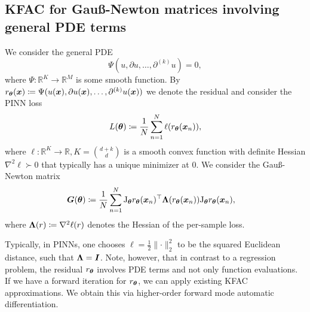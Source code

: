 \subsection{KFAC for Gauß-Newton matrices involving general PDE terms} \label{sec:KFAC-general}
We consider the general %
PDE
\begin{equation}
    \Psi(u, \partial u, \dots, \partial^{(k)} u) = 0,
\end{equation}
where $\Psi\colon \mathbb R^{K}\to\mathbb R^M$ is some smooth function.
By $r_\vtheta(\vx)\coloneqq \Psi(u(\vx), \partial u(\vx), \dots, \partial^{(k)} u(\vx))%
$ %
we denote the residual and consider the PINN loss
\begin{equation}
    L({\bm{\theta}})\coloneqq \frac1N\sum_{n=1}^N \ell(r_{{\bm{\theta}}}({\bm{x}}_n)),
\end{equation}
where $\ell\colon\mathbb R^K\to\mathbb R, K=\binom{d+k}{d}$ is a smooth convex function with definite Hessian $\nabla^2\ell\succ0$ that typically has a unique minimizer at $0$. 
We consider the Gauß-Newton matrix
\begin{align}
    {\bm{G}}({\bm{\theta}}) & \coloneqq \frac1N\sum_{n=1}^N \mathrm{J}_{\bm{\theta}} r_{\bm{\theta}}({\bm{x}}_n)^\top {\bm{\Lambda}}(r_{\bm{\theta}}({\bm{x}}_n)) \mathrm{J}_{\bm{\theta}} r_{\bm{\theta}}({\bm{x}}_n),
\end{align}
where ${\bm{\Lambda}}(r)\coloneqq \nabla^2 \ell(r)$ denotes the Hessian of the per-sample loss. %

Typically, in PINNs, one chooses $\ell = \frac12\lVert \cdot \rVert_2^2$ to be the squared Euclidean distance, such that ${\bm{\Lambda}} = {\bm{I}}$.
Note, however, that in contrast to a regression problem, the residual $r_{\bm{\theta}}$ involves PDE terms and not only function evaluations.
If we have a forward iteration for $r_{\bm{\theta}}$, we can apply existing KFAC approximations.
We obtain this via higher-order forward mode automatic differentiation.

